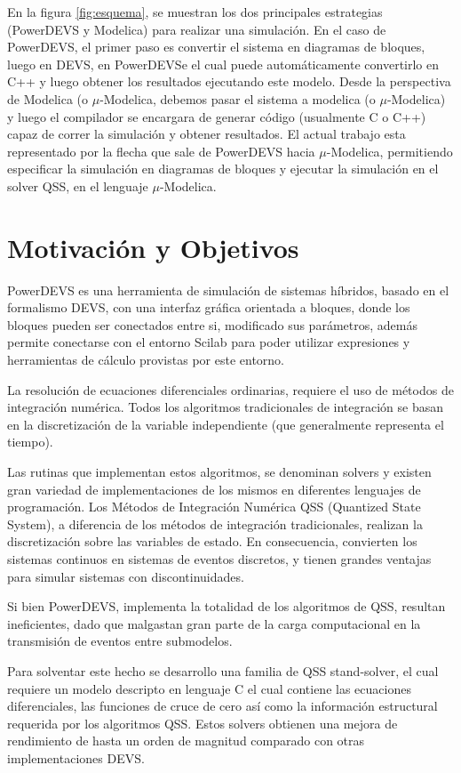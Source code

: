 \documentclass[a4paper,	11pt]{report}
\begin{document}
En la figura \ref{fig:esquema}, se muestran los dos principales estrategias (PowerDEVS y Modelica) para realizar una simulación. En el caso de PowerDEVS, el primer paso es convertir el sistema en diagramas de bloques, luego en DEVS, en PowerDEVSe el cual puede automáticamente convertirlo en C++ y luego obtener los resultados ejecutando este modelo. Desde la perspectiva de Modelica (o $\mu$-Modelica, debemos pasar el sistema a modelica (o $\mu$-Modelica) y luego el compilador se encargara de generar código (usualmente C o C++) capaz de correr la simulación y obtener resultados.
El actual trabajo esta representado por la flecha que sale de PowerDEVS hacia $\mu$-Modelica, permitiendo especificar la simulación en diagramas de bloques y ejecutar la simulación en el solver QSS, en el lenguaje $\mu$-Modelica.


\section{Motivación y Objetivos}
PowerDEVS\cite{BK11} es una herramienta de simulación de sistemas híbridos, basado en el formalismo DEVS\cite{Zeigler:2000:TMS:580780}, con una interfaz gráfica orientada a bloques, donde los bloques pueden ser conectados entre si, modificado sus parámetros, además permite conectarse con el entorno Scilab para poder utilizar expresiones y herramientas de cálculo provistas por este entorno.

La resolución de ecuaciones diferenciales ordinarias, requiere el uso de métodos de integración numérica. Todos los algoritmos tradicionales de integración se basan en la discretización de la variable independiente (que generalmente representa el tiempo).

Las rutinas que implementan estos algoritmos, se denominan solvers y existen gran variedad de implementaciones de los mismos en diferentes lenguajes de programación. Los Métodos de Integración Numérica QSS (Quantized State System), a diferencia de los métodos de integración tradicionales, realizan la discretización sobre las variables de estado. En consecuencia, convierten los sistemas continuos en sistemas de eventos discretos, y tienen grandes ventajas para simular sistemas con discontinuidades.

Si bien PowerDEVS, implementa la totalidad de los algoritmos de QSS, resultan ineficientes, dado que malgastan gran parte de la carga computacional en la transmisión de eventos entre submodelos.

Para solventar este hecho se desarrollo una familia de QSS stand-solver, el cual requiere un modelo descripto en lenguaje C el cual contiene las ecuaciones diferenciales, las funciones de cruce de cero así como la información estructural requerida por los algoritmos QSS. Estos solvers obtienen una mejora de rendimiento de hasta un orden de magnitud comparado con otras implementaciones DEVS.
\end{document}
